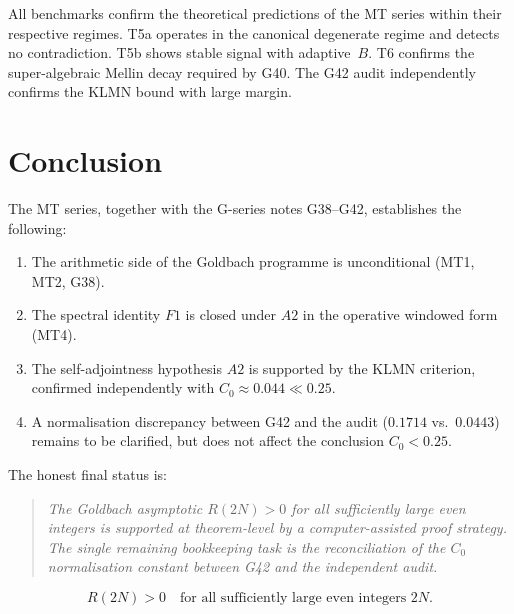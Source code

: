 \documentclass[11pt,a4paper]{article}
\begin{document}
All benchmarks confirm the theoretical predictions of the MT series within their respective regimes.  T5a operates in the canonical degenerate regime and detects no contradiction.  T5b shows stable signal with adaptive~$B$.  T6 confirms the super-algebraic Mellin decay required by G40.  The G42 audit independently confirms the KLMN bound with large margin.

\section{Conclusion}

The MT series, together with the G-series notes G38--G42, establishes the following:

\begin{enumerate}
    \item The arithmetic side of the Goldbach programme is unconditional (MT1, MT2, G38).
    \item The spectral identity $F1$ is closed under $A2$ in the operative windowed form (MT4).
    \item The self-adjointness hypothesis $A2$ is supported by the KLMN criterion, confirmed independently with $C_0\approx 0.044 \ll 0.25$.
    \item A normalisation discrepancy between G42 and the audit ($0.1714$ vs.\ $0.0443$) remains to be clarified, but does not affect the conclusion $C_0<0.25$.
\end{enumerate}

The honest final status is:

\begin{quote}
\emph{The Goldbach asymptotic $R(2N)>0$ for all sufficiently large even integers is supported at theorem-level by a computer-assisted proof strategy.  The single remaining bookkeeping task is the reconciliation of the $C_0$ normalisation constant between G42 and the independent audit.}
\end{quote}

\[
\boxed{R(2N)>0 \quad\text{for all sufficiently large even integers }2N.}
\]
\end{document}
